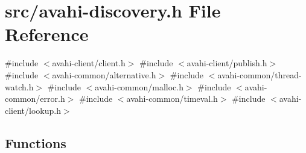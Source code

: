 \hypertarget{avahi-discovery_8h}{\section{src/avahi-\/discovery.h \-File \-Reference}
\label{avahi-discovery_8h}
}
{\ttfamily \#include $<$avahi-\/client/client.\-h$>$}\*
{\ttfamily \#include $<$avahi-\/client/publish.\-h$>$}\*
{\ttfamily \#include $<$avahi-\/common/alternative.\-h$>$}\*
{\ttfamily \#include $<$avahi-\/common/thread-\/watch.\-h$>$}\*
{\ttfamily \#include $<$avahi-\/common/malloc.\-h$>$}\*
{\ttfamily \#include $<$avahi-\/common/error.\-h$>$}\*
{\ttfamily \#include $<$avahi-\/common/timeval.\-h$>$}\*
{\ttfamily \#include $<$avahi-\/client/lookup.\-h$>$}\*
\subsection*{\-Functions}
